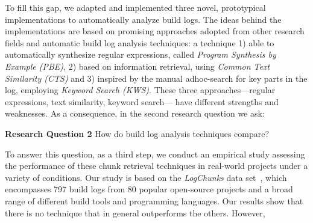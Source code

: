 


To fill this gap, we adapted and implemented three novel, prototypical
implementations to
automatically analyze build logs.
The ideas behind the implementations are based on promising approaches
adopted from other research fields and automatic build log analysis
techniques:
a technique 1) able to automatically synthesize regular expressions,
called \emph{Program Synthesis by Example (PBE)}, 2) based on information
retrieval, using \emph{Common Text Similarity (CTS)}  and 3)
inspired by the manual adhoc-search for key parts in the log, employing
\emph{Keyword Search (KWS)}.
These three approaches---regular expressions, text similarity,
keyword search---
have different strengths and weaknesses.
As a consequence,
in the second research question we ask:

\begin{simplebox}[minipage boxed title*=-5cm]{\textbf{Research Question
2}}
How do build log analysis techniques compare?
\end{simplebox}

To answer this question, as a third step,
we conduct an empirical study assessing the performance
of these chunk retrieval techniques in
real-world projects under a variety of conditions.
Our study is based on the \emph{LogChunks} data
set~\cite{brandt2020logchunks}, which encompasses 797 build logs from
80 popular open-source projects and a broad range of different
build tools and programming languages.
Our results show that there is no technique that in general outperforms
the others.
However,

